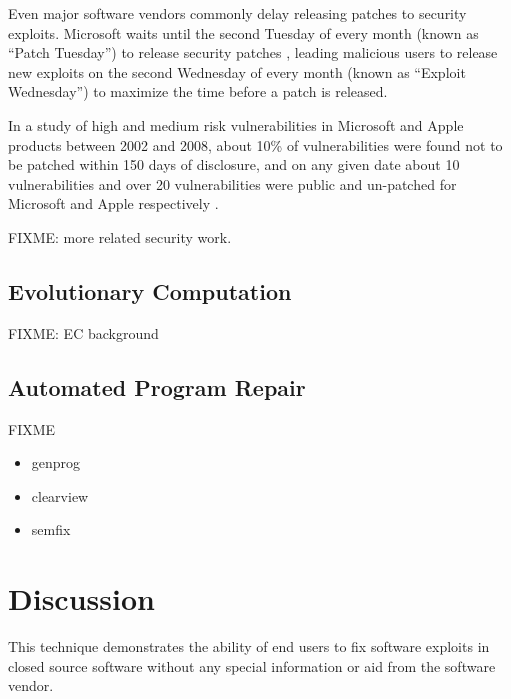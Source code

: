 \documentclass{sigcomm-alternate}
\begin{document}
Even major software vendors commonly delay releasing patches to
security exploits.  Microsoft waits until the second Tuesday of every
month (known as ``Patch Tuesday'') to release security patches
\cite{lemos2003microsoft}, leading malicious users to release new
exploits on the second Wednesday of every month (known as ``Exploit
Wednesday'') to maximize the time before a patch is released.

In a study of high and medium risk vulnerabilities in Microsoft and
Apple products between 2002 and 2008, about 10\% of
vulnerabilities were found not to be patched within 150 days of
disclosure, and on any given date about 10 vulnerabilities and over 20
vulnerabilities were public and un-patched for Microsoft and Apple
respectively \cite{frei20080}.

FIXME: more related security work.

\subsection{Evolutionary Computation}
\label{sec-5-2}

FIXME: EC background

\subsection{Automated Program Repair}
\label{sec-5-3}

FIXME

\begin{itemize}
\item genprog
\item clearview
\item semfix
\end{itemize}

\section{Discussion}
\label{sec-6}
This technique demonstrates the ability of end users to fix software
exploits in closed source software without any special information or
aid from the software vendor.

\end{document}
